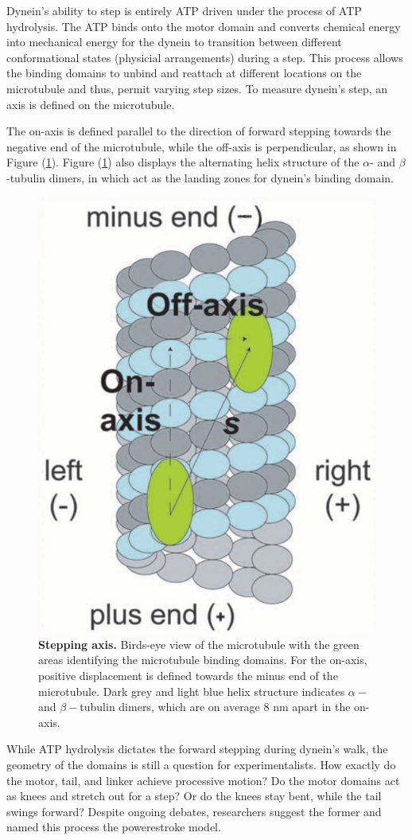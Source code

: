 Dynein's ability to step is entirely ATP driven under the process of ATP hydrolysis. The ATP binds onto the motor domain and converts chemical energy into mechanical energy for the dynein to transition between different conformational states (physicial arrangements) during a step. This process allows the binding domains to unbind and reattach at different locations on the microtubule and thus, permit varying step sizes. To measure dynein's step, an axis is defined on the microtubule.

The on-axis is defined parallel to the direction of forward stepping towards the negative end of the microtubule, while the off-axis is perpendicular, as shown in Figure (\ref{fig:axis}). Figure (\ref{fig:axis}) also displays the alternating helix structure of the $\alpha$- and $\beta$-tubulin dimers, in which act as the landing zones for dynein's binding domain.  

\begin{figure}[H]
	\centering
	\includegraphics[width=0.3\columnwidth]{Figures/Onaxis.png}
	\caption[Stepping Axis]{\textbf{Stepping axis.} Birds-eye view of the microtubule with the green areas identifying the microtubule binding domains. For the on-axis, positive displacement is defined towards the minus end of the microtubule. Dark grey and light blue helix structure indicates $\alpha-$ and $\beta-$tubulin dimers, which are on average 8 nm apart in the on-axis. \cite{Dewitt2012} }
	\label{fig:axis}
\end{figure}

While ATP hydrolysis dictates the forward stepping during dynein's walk, the geometry of the domains is still a question for experimentalists. How exactly do the motor, tail, and linker achieve processive motion? Do the motor domains act as knees and stretch out for a step? Or do the knees stay bent, while the tail swings forward? Despite ongoing debates, researchers suggest the former and named this process the powerestroke model. 



